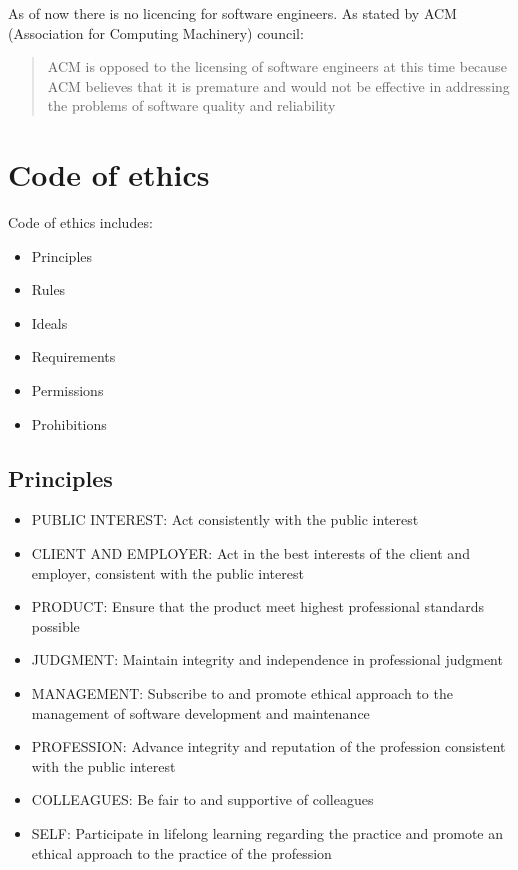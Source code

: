 \documentclass{article}
\begin{document}
\begin{flushleft}
As of now there is no licencing for software engineers. As stated by ACM (Association for Computing Machinery) council:

\begin{quotation}
ACM is opposed to the licensing of software
engineers at this time because ACM believes that it is
premature and would not be effective in addressing
the problems of software quality and reliability
\end{quotation}

\end{flushleft}

\section{Code of ethics}

Code of ethics includes:
\begin{itemize}
  \item Principles
  \item Rules
  \item Ideals
  \item Requirements
  \item Permissions
  \item Prohibitions
\end{itemize}

\subsection{Principles}
\begin{itemize}
  \item PUBLIC INTEREST: Act consistently with the public interest
  \item CLIENT AND EMPLOYER: Act in the best interests of the client and employer, consistent with the public interest
  \item PRODUCT: Ensure that the product meet highest professional standards possible
  \item JUDGMENT: Maintain integrity and independence in professional judgment
  \item MANAGEMENT: Subscribe to and promote ethical approach to the management of software development and maintenance
  \item PROFESSION: Advance integrity and reputation of the profession consistent with the public interest
  \item COLLEAGUES: Be fair to and supportive of colleagues
  \item SELF: Participate in lifelong learning regarding the practice and promote an ethical approach to the practice of the profession
\end{itemize}
\end{document}

